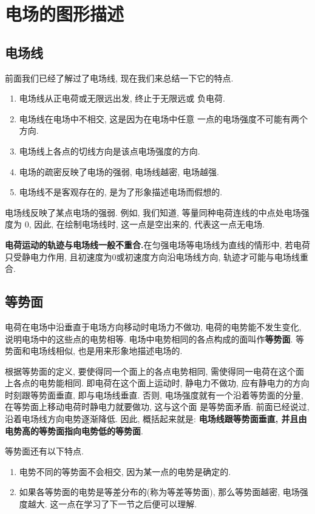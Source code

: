 \documentclass[11pt,a4paper]{ctexbook}
\begin{document}
\section{电场的图形描述}
\label{电场的图形描述}

\subsection{电场线}

前面我们已经了解过了电场线, 现在我们来总结一下它的特点.

\begin{enumerate}
    \item 电场线从正电荷或无限远出发, 终止于无限远或
          负电荷.
    \item 电场线在电场中不相交, 这是因为在电场中任意
          一点的电场强度不可能有两个方向.
    \item 电场线上各点的切线方向是该点电场强度的方向.
    \item 电场的疏密反映了电场的强弱, 电场线越密, 电场越强.
    \item 电场线不是客观存在的, 是为了形象描述电场而假想的.
\end{enumerate}

电场线反映了某点电场的强弱. 例如, 我们知道, 等量同种电荷连线的中点处电场强度为 0, 因此,
在绘制电场线时, 这一点是空出来的, 代表这一点无电场.

\textbf{电荷运动的轨迹与电场线一般不重合.}在匀强电场等电场线为直线的情形中, 若电荷只受静电力作用, 且初速度为0或初速度方向沿电场线方向, 轨迹才可能与电场线重合.

\subsection{等势面}

电荷在电场中沿垂直于电场方向移动时电场力不做功, 电荷的电势能不发生变化,
说明电场中的这些点的电势相等. 电场中电势相同的各点构成的面叫作\textbf{等势面}.
等势面和电场线相似, 也是用来形象地描述电场的.

根据等势面的定义, 要使得同一个面上的各点电势相同, 需使得同一电荷在这个面上各点的电势能相同.
即电荷在这个面上运动时, 静电力不做功, 应有静电力的方向时刻跟等势面垂直, 即与电场线垂直. 否则,
电场强度就有一个沿着等势面的分量, 在等势面上移动电荷时静电力就要做功, 这与这个面
是等势面矛盾. 前面已经说过, 沿着电场线方向电势逐渐降低. 因此, 概括起来就是:
\textbf{电场线跟等势面垂直, 并且由电势高的等势面指向电势低的等势面}.

等势面还有以下特点.
\begin{enumerate}
    \item 电势不同的等势面不会相交, 因为某一点的电势是确定的.
    \item 如果各等势面的电势是等差分布的(称为等差等势面), 那么等势面越密, 电场强度越大.
    这一点在学习了下一节之后便可以理解.
\end{enumerate}
\end{document}
